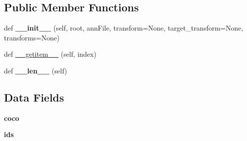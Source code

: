\subsection*{Public Member Functions}
\begin{DoxyCompactItemize}
\item 
\mbox{\label{classtorchvision_1_1datasets_1_1coco_1_1CocoCaptions_a9e2ff4d271ccb1ef55cc4b495c3663eb}} 
def {\bfseries \+\_\+\+\_\+init\+\_\+\+\_\+} (self, root, ann\+File, transform=None, target\+\_\+transform=None, transforms=None)
\item 
def \hyperlink{classtorchvision_1_1datasets_1_1coco_1_1CocoCaptions_a801a9385cb606e4941cfcd4ebf5555db}{\+\_\+\+\_\+getitem\+\_\+\+\_\+} (self, index)
\item 
\mbox{\label{classtorchvision_1_1datasets_1_1coco_1_1CocoCaptions_a7a9a9640f3b6c2978e24c681166c7ddb}} 
def {\bfseries \+\_\+\+\_\+len\+\_\+\+\_\+} (self)
\end{DoxyCompactItemize}
\subsection*{Data Fields}
\begin{DoxyCompactItemize}
\item 
\mbox{\label{classtorchvision_1_1datasets_1_1coco_1_1CocoCaptions_a973225a555b6034794abde6c1dfc3384}} 
{\bfseries coco}
\item 
\mbox{\label{classtorchvision_1_1datasets_1_1coco_1_1CocoCaptions_a526285e996258d3aa0a29bb56cf1c617}} 
{\bfseries ids}
\end{DoxyCompactItemize}


